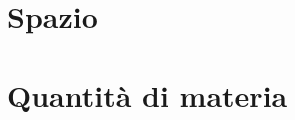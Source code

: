 \documentclass[letterpaper,10pt,italian]{jupyterBook}
\begin{document}
\sphinxstepscope


\section{Spazio}
\label{\detokenize{ch/intro/physical_quantities-space:spazio}}\label{\detokenize{ch/intro/physical_quantities-space:physics-hs-intro-physical-quantities-space}}\label{\detokenize{ch/intro/physical_quantities-space::doc}}
\sphinxstepscope


\section{Quantità di materia}
\label{\detokenize{ch/intro/physical_quantities-mass:quantita-di-materia}}\label{\detokenize{ch/intro/physical_quantities-mass:physics-hs-intro-physical-quantities-mass}}\label{\detokenize{ch/intro/physical_quantities-mass::doc}}
\sphinxstepscope
\end{document}
